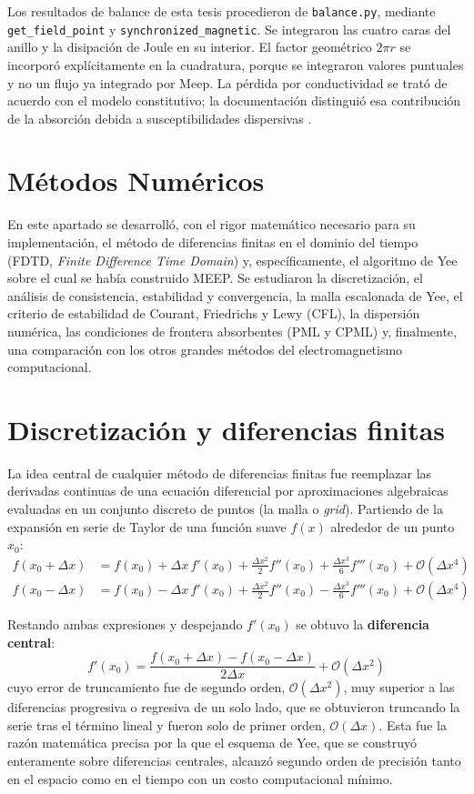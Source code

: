 Los resultados de balance de esta tesis procedieron de \texttt{balance.py}, mediante \texttt{get\_field\_point} y \texttt{synchronized\_magnetic}. Se integraron las cuatro caras del anillo y la disipación de Joule en su interior. El factor geométrico $2\pi r$ se incorporó explícitamente en la cuadratura, porque se integraron valores puntuales y no un flujo ya integrado por Meep. La pérdida por conductividad se trató de acuerdo con el modelo constitutivo; la documentación distinguió esa contribución de la absorción debida a susceptibilidades dispersivas \citep{MeepMaterials,MeepIssue1276}.

\section{Métodos Numéricos}

En este apartado se desarrolló, con el rigor matemático necesario para su implementación, el método de diferencias finitas en el dominio del tiempo (FDTD, \textit{Finite Difference Time Domain}) y, específicamente, el algoritmo de Yee sobre el cual se había construido MEEP. Se estudiaron la discretización, el análisis de consistencia, estabilidad y convergencia, la malla escalonada de Yee, el criterio de estabilidad de Courant, Friedrichs y Lewy (CFL), la dispersión numérica, las condiciones de frontera absorbentes (PML y CPML) y, finalmente, una comparación con los otros grandes métodos del electromagnetismo computacional.

\section{Discretización y diferencias finitas}
La idea central de cualquier método de diferencias finitas fue reemplazar las derivadas continuas de una ecuación diferencial por aproximaciones algebraicas evaluadas en un conjunto discreto de puntos (la malla o \textit{grid}). Partiendo de la expansión en serie de Taylor de una función suave $f(x)$ alrededor de un punto $x_0$:
\begin{align}
    f(x_0+\Delta x) &= f(x_0) + \Delta x\, f'(x_0) + \frac{\Delta x^2}{2}f''(x_0) + \frac{\Delta x^3}{6}f'''(x_0) + \mathcal{O}(\Delta x^4) \\
    f(x_0-\Delta x) &= f(x_0) - \Delta x\, f'(x_0) + \frac{\Delta x^2}{2}f''(x_0) - \frac{\Delta x^3}{6}f'''(x_0) + \mathcal{O}(\Delta x^4)
\end{align}

Restando ambas expresiones y despejando $f'(x_0)$ se obtuvo la \textbf{diferencia central}:
\begin{equation}
    f'(x_0) = \frac{f(x_0+\Delta x)-f(x_0-\Delta x)}{2\Delta x} + \mathcal{O}(\Delta x^2)
\end{equation}
cuyo error de truncamiento fue de segundo orden, $\mathcal{O}(\Delta x^2)$, muy superior a las diferencias progresiva o regresiva de un solo lado, que se obtuvieron truncando la serie tras el término lineal y fueron solo de primer orden, $\mathcal{O}(\Delta x)$. Esta fue la razón matemática precisa por la que el esquema de Yee, que se construyó enteramente sobre diferencias centrales, alcanzó segundo orden de precisión tanto en el espacio como en el tiempo con un costo computacional mínimo.

